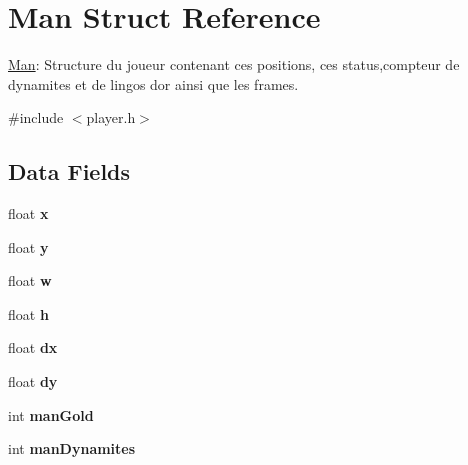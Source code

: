 \hypertarget{struct_man}{}\section{Man Struct Reference}
\label{struct_man}


\hyperlink{struct_man}{Man}\+: Structure du joueur contenant ces positions, ces status,compteur de dynamites et de lingos d\textquotesingle{}or ainsi que les frames.  




{\ttfamily \#include $<$player.\+h$>$}

\subsection*{Data Fields}
\begin{DoxyCompactItemize}
\item 
\hypertarget{struct_man_ad0da36b2558901e21e7a30f6c227a45e}{}float {\bfseries x}\label{struct_man_ad0da36b2558901e21e7a30f6c227a45e}

\item 
\hypertarget{struct_man_aa4f0d3eebc3c443f9be81bf48561a217}{}float {\bfseries y}\label{struct_man_aa4f0d3eebc3c443f9be81bf48561a217}

\item 
\hypertarget{struct_man_a56eca241e2896b9f57a79589e76fd24b}{}float {\bfseries w}\label{struct_man_a56eca241e2896b9f57a79589e76fd24b}

\item 
\hypertarget{struct_man_a85f2f1bd58b3b44ffdf3881823393959}{}float {\bfseries h}\label{struct_man_a85f2f1bd58b3b44ffdf3881823393959}

\item 
\hypertarget{struct_man_a9eae6c1f38db98ab568f3ed3771a969d}{}float {\bfseries dx}\label{struct_man_a9eae6c1f38db98ab568f3ed3771a969d}

\item 
\hypertarget{struct_man_a8f461b6142ce8725218813abb23b06a3}{}float {\bfseries dy}\label{struct_man_a8f461b6142ce8725218813abb23b06a3}

\item 
\hypertarget{struct_man_adc433df95140a396aad57577e5276dcf}{}int {\bfseries man\+Gold}\label{struct_man_adc433df95140a396aad57577e5276dcf}

\item 
\hypertarget{struct_man_a55ffefeee67ba027d92c5c0e6c21fd85}{}int {\bfseries man\+Dynamites}\label{struct_man_a55ffefeee67ba027d92c5c0e6c21fd85}


\end{DoxyCompactItemize}
